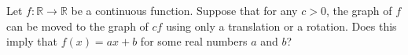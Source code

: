 Let \( f \colon  \mathbb{R}\to \mathbb{R}\) be a continuous function. Suppose that for any \( c > 0\), the graph of \( f\) can be moved to the graph of \( cf\) using only a translation or a rotation. Does this imply that \( f(x) = ax+b\) for some real numbers \( a\) and \( b\)?